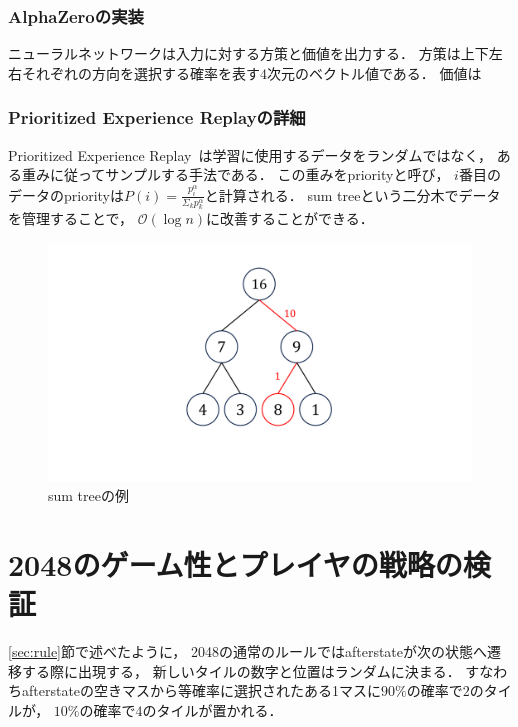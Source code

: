 \subsection{AlphaZeroの実装}
ニューラルネットワークは入力に対する方策と価値を出力する．
方策は上下左右それぞれの方向を選択する確率を表す$4$次元のベクトル値である．
価値は

\subsection{Prioritized Experience Replayの詳細}
Prioritized Experience Replay~\cite{prioritized}は学習に使用するデータをランダムではなく， ある重みに従ってサンプルする手法である．
この重みをpriorityと呼び， $i$番目のデータのpriorityは$P(i) = \frac{p_{i}^{\alpha}}{\Sigma_k p_{k}^{\alpha}}$と計算される．
sum treeという二分木でデータを管理することで， $\mathcal{O}(\log n)$に改善することができる．
\begin{figure}[t]
    \centering
    \includegraphics[width=0.4\linewidth{}]{figures/sumtree.pdf}
    \caption{sum treeの例}
    \label{fig:sumtree}
\end{figure}

\chapter{2048のゲーム性とプレイヤの戦略の検証}
\ref{sec:rule}節で述べたように， 2048の通常のルールではafterstateが次の状態へ遷移する際に出現する， 新しいタイルの数字と位置はランダムに決まる．
すなわちafterstateの空きマスから等確率に選択されたある1マスに$90\%$の確率で$2$のタイルが， $10\%$の確率で$4$のタイルが置かれる．

